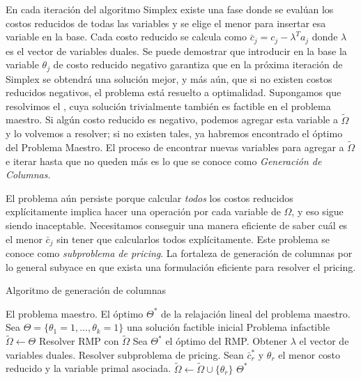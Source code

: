 En cada iteración del algoritmo Simplex existe una fase donde se evalúan los costos reducidos de todas las variables y se elige el menor para insertar esa variable en la base. Cada costo reducido se calcula como $\bar{c}_j = c_j - \lambda^{T}a_j$ donde $\lambda$ es el vector de variables duales. Se puede demostrar que introducir en la base la variable $\theta_j$ de costo reducido negativo garantiza que en la próxima iteración de Simplex se obtendrá una solución mejor, y más aún, que si no existen costos reducidos negativos, el problema está resuelto a optimalidad. Supongamos que resolvimos el , cuya solución trivialmente también es factible en el problema maestro. Si algún costo reducido es negativo, podemos agregar esta variable a $\tilde{\Omega}$ y lo volvemos a resolver; si no existen tales, ya habremos encontrado el óptimo del Problema Maestro. El proceso de encontrar nuevas variables para agregar a $\tilde{\Omega}$ e iterar hasta que no queden más es lo que se conoce como \emph{Generación de Columnas}.

El problema aún persiste porque calcular \emph{todos} los costos reducidos explícitamente implica hacer una operación por cada variable de $\Omega$, y eso sigue siendo inaceptable. Necesitamos conseguir una manera eficiente de saber cuál es el menor $\bar{c}_j$ sin tener que calcularlos todos explícitamente. Este problema se conoce como \emph{subproblema de pricing}. La fortaleza de generación de columnas por lo general subyace en que exista una formulación eficiente para resolver el pricing.

\begin{algorithm}[H]
    \caption{Algoritmo de generación de columnas}
    \label{al:column-generation}
    \begin{algorithmic}[1]
        \Require El problema maestro. 
        \Ensure El óptimo $\Theta^{*}$ de la relajación lineal del problema maestro. 
        \State Sea $\Theta = \{\theta_1 = 1, \dots, \theta_k = 1\}$ una solución factible inicial
        \If{$\Theta = \emptyset$}
            \Return Problema infactible
        \EndIf
        \State $\tilde{\Omega} \gets \Theta$
            \State Resolver RMP con $\tilde{\Omega}$
            \State Sea $\Theta^{*}$ el óptimo del RMP.
            \State Obtener $\lambda$ el vector de variables duales.
            \State Resolver subproblema de pricing.
            \State Sean $\bar{c}^{*}_r$ y $\theta_r$ el menor costo reducido y la variable primal asociada. 
            \State $\tilde{\Omega} \gets \tilde{\Omega} \cup \{\theta_r\}$
        \EndWhile
        \Return $\Theta^{*}$
    \end{algorithmic}
\end{algorithm}

